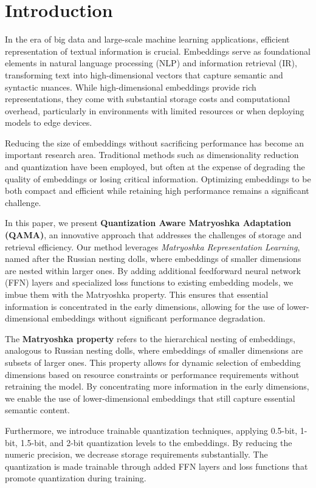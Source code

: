 \section{Introduction}  
  
In the era of big data and large-scale machine learning applications, efficient representation of textual information is crucial. Embeddings serve as foundational elements in natural language processing (NLP) and information retrieval (IR), transforming text into high-dimensional vectors that capture semantic and syntactic nuances. While high-dimensional embeddings provide rich representations, they come with substantial storage costs and computational overhead, particularly in environments with limited resources or when deploying models to edge devices.  
  
Reducing the size of embeddings without sacrificing performance has become an important research area. Traditional methods such as dimensionality reduction and quantization have been employed, but often at the expense of degrading the quality of embeddings or losing critical information. Optimizing embeddings to be both compact and efficient while retaining high performance remains a significant challenge.  
  
In this paper, we present \textbf{Quantization Aware Matryoshka Adaptation (QAMA)}, an innovative approach that addresses the challenges of storage and retrieval efficiency. 
Our method leverages \textit{Matryoshka Representation Learning}, named after the Russian nesting dolls, where embeddings of smaller dimensions are nested within larger ones. By adding additional feedforward neural network (FFN) layers and specialized loss functions to existing embedding models, we imbue them with the Matryoshka property. This ensures that essential information is concentrated in the early dimensions, allowing for the use of lower-dimensional embeddings without significant performance degradation.  
  
The \textbf{Matryoshka property} refers to the hierarchical nesting of embeddings, analogous to Russian nesting dolls, where embeddings of smaller dimensions are subsets of larger ones. This property allows for dynamic selection of embedding dimensions based on resource constraints or performance requirements without retraining the model. By concentrating more information in the early dimensions, we enable the use of lower-dimensional embeddings that still capture essential semantic content.  

Furthermore, we introduce trainable quantization techniques, applying 0.5-bit, 1-bit, 1.5-bit, and 2-bit quantization levels to the embeddings. By reducing the numeric precision, we decrease storage requirements substantially. The quantization is made trainable through added FFN layers and loss functions that promote quantization during training.  
  
